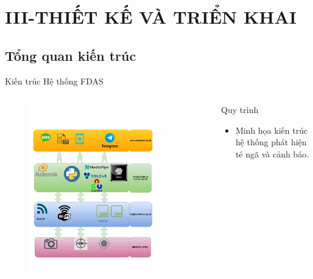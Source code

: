 \section{III-THIẾT KẾ VÀ TRIỂN KHAI}
\subsection{Tổng quan kiến trúc}

\begin{frame}[fragile]{Kiến trúc Hệ thống FDAS}
    \begin{columns}[t]
        \begin{column}{0.5\textwidth}
            \begin{figure}
                \centering
                \includegraphics[width=0.85\textwidth,height=0.8\textheight,keepaspectratio]{images/system_architecture_diagram.pdf}
            \end{figure}
        \end{column}
        \begin{column}{0.5\textwidth}
            \begin{block}{Quy trình}
                \begin{itemize}
                    \item Minh họa kiến trúc hệ thống phát hiện té ngã và cảnh báo.

\end{itemize}
\end{block}
\end{column}
\end{columns}
\end{frame}
